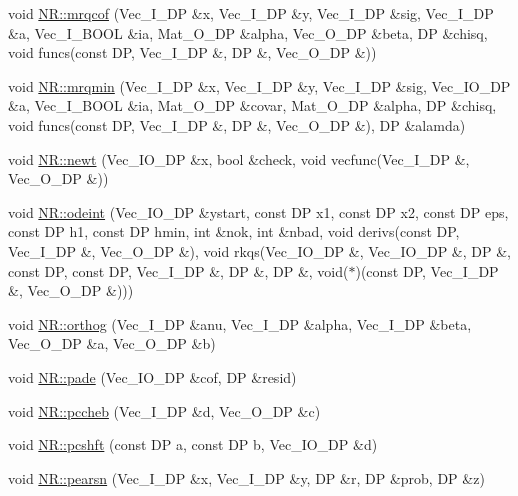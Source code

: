 \begin{DoxyCompactItemize}
void \mbox{\hyperlink{namespaceNR_a03017a1caf19642fa6477f96dd20dbb3}{N\+R\+::mrqcof}} (Vec\+\_\+\+I\+\_\+\+DP \&x, Vec\+\_\+\+I\+\_\+\+DP \&y, Vec\+\_\+\+I\+\_\+\+DP \&sig, Vec\+\_\+\+I\+\_\+\+DP \&a, Vec\+\_\+\+I\+\_\+\+B\+O\+OL \&ia, Mat\+\_\+\+O\+\_\+\+DP \&alpha, Vec\+\_\+\+O\+\_\+\+DP \&beta, DP \&chisq, void funcs(const DP, Vec\+\_\+\+I\+\_\+\+DP \&, DP \&, Vec\+\_\+\+O\+\_\+\+DP \&))
\item 
void \mbox{\hyperlink{namespaceNR_a5e564c0d50dc1bbc161cbcee235b67bc}{N\+R\+::mrqmin}} (Vec\+\_\+\+I\+\_\+\+DP \&x, Vec\+\_\+\+I\+\_\+\+DP \&y, Vec\+\_\+\+I\+\_\+\+DP \&sig, Vec\+\_\+\+I\+O\+\_\+\+DP \&a, Vec\+\_\+\+I\+\_\+\+B\+O\+OL \&ia, Mat\+\_\+\+O\+\_\+\+DP \&covar, Mat\+\_\+\+O\+\_\+\+DP \&alpha, DP \&chisq, void funcs(const DP, Vec\+\_\+\+I\+\_\+\+DP \&, DP \&, Vec\+\_\+\+O\+\_\+\+DP \&), DP \&alamda)
\item 
void \mbox{\hyperlink{namespaceNR_aa58f9fd3b532e550929b4ffa67b50e4d}{N\+R\+::newt}} (Vec\+\_\+\+I\+O\+\_\+\+DP \&x, bool \&check, void vecfunc(Vec\+\_\+\+I\+\_\+\+DP \&, Vec\+\_\+\+O\+\_\+\+DP \&))
\item 
void \mbox{\hyperlink{namespaceNR_a5393670acc86ad48e87504e8a7109140}{N\+R\+::odeint}} (Vec\+\_\+\+I\+O\+\_\+\+DP \&ystart, const DP x1, const DP x2, const DP eps, const DP h1, const DP hmin, int \&nok, int \&nbad, void derivs(const DP, Vec\+\_\+\+I\+\_\+\+DP \&, Vec\+\_\+\+O\+\_\+\+DP \&), void rkqs(Vec\+\_\+\+I\+O\+\_\+\+DP \&, Vec\+\_\+\+I\+O\+\_\+\+DP \&, DP \&, const DP, const DP, Vec\+\_\+\+I\+\_\+\+DP \&, DP \&, DP \&, void($\ast$)(const DP, Vec\+\_\+\+I\+\_\+\+DP \&, Vec\+\_\+\+O\+\_\+\+DP \&)))
\item 
void \mbox{\hyperlink{namespaceNR_a09eb4179b4158c839db9301f34122f40}{N\+R\+::orthog}} (Vec\+\_\+\+I\+\_\+\+DP \&anu, Vec\+\_\+\+I\+\_\+\+DP \&alpha, Vec\+\_\+\+I\+\_\+\+DP \&beta, Vec\+\_\+\+O\+\_\+\+DP \&a, Vec\+\_\+\+O\+\_\+\+DP \&b)
\item 
void \mbox{\hyperlink{namespaceNR_a8e789b4a9285a750bd28cbf9d1b57654}{N\+R\+::pade}} (Vec\+\_\+\+I\+O\+\_\+\+DP \&cof, DP \&resid)
\item 
void \mbox{\hyperlink{namespaceNR_a986417223fa9ced15bc520606386a4db}{N\+R\+::pccheb}} (Vec\+\_\+\+I\+\_\+\+DP \&d, Vec\+\_\+\+O\+\_\+\+DP \&c)
\item 
void \mbox{\hyperlink{namespaceNR_acbcb308d5c9adf2ac96084b61fff25be}{N\+R\+::pcshft}} (const DP a, const DP b, Vec\+\_\+\+I\+O\+\_\+\+DP \&d)
\item 
void \mbox{\hyperlink{namespaceNR_a08a1c52f699b77be9ca8b79dd29fc143}{N\+R\+::pearsn}} (Vec\+\_\+\+I\+\_\+\+DP \&x, Vec\+\_\+\+I\+\_\+\+DP \&y, DP \&r, DP \&prob, DP \&z)

\end{DoxyCompactItemize}

